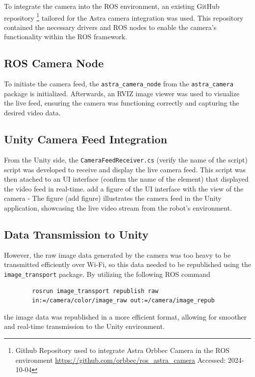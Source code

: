     To integrate the camera into the ROS environment, an existing GitHub repository \footnote{Github Repository used to integrate Astra Orbbec Camera in the ROS environment \url{https://github.com/orbbec/ros_astra_camera} Accessed: 2024-10-04} tailored for the Astra camera integration was used. This repository contained the necessary drivers and ROS nodes to enable the camera's functionality within the ROS framework.

    \subsection{ROS Camera Node}
    To initiate the camera feed, the \texttt{astra\_camera\_node} from the \texttt{astra\_camera} package is initialized. Afterwards, an RVIZ image viewer was used to visualize the live feed, ensuring the camera was functioning correctly and capturing the desired video data.

    \subsection{Unity Camera Feed Integration}
    From the Unity side, the \texttt{CameraFeedReceiver.cs} (verify the name of the script) script was developed to receive and display the live camera feed. This script was then atached to an UI interface (confirm the name of the element) that displayed the video feed in real-time. 
    add a figure of the UI interface with the view of the camera - The figure (add figure) illustrates the camera feed in the Unity application, showcasing the live video stream from the robot's environment.

    \subsection{Data Transmission to Unity} 
     
    However, the raw image data generated by the camera was too heavy to be transmitted efficiently over Wi-Fi, so this data needed to be republished using the \texttt{image\_transport} package.
    By utilizing the following \ac{ROS} command 
    \begin{verbatim}
        rosrun image_transport republish raw 
        in:=/camera/color/image_raw out:=/camera/image_repub
    \end{verbatim}
    the image data was republished in a more efficient format, allowing for smoother and real-time transmission to the Unity environment.
    

